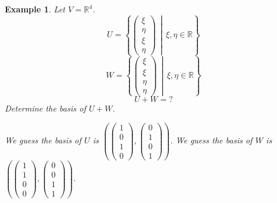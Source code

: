 \documentclass[a4paper,landscape,twocolumn]{article}
\newcommand\setdef[2]{\left\{#1\,\middle|\,#2\right\}}
\newtheorem{ex}{Example}
\begin{document}
\begin{ex}
  Let $V = \mathbb R^4$.
  \[ U = \setdef{\begin{pmatrix} \xi \\ \eta \\ \xi \\ \eta \end{pmatrix}}{\xi, \eta \in \mathbb R} \]
  \[ W = \setdef{\begin{pmatrix} \xi \\ \xi \\ \eta \\ \eta \end{pmatrix}}{\xi, \eta \in \mathbb R} \]
  \[ U + W = ? \]
  Determine the basis of $U + W$.

  We guess the basis of $U$ is $\left(\begin{pmatrix} 1 \\ 0 \\ 1 \\ 0 \end{pmatrix}, \begin{pmatrix} 0 \\ 1 \\ 0 \\ 1 \end{pmatrix}\right)$.
  We guess the basis of $W$ is $\left(\begin{pmatrix} 1 \\ 1 \\ 0 \\ 0 \end{pmatrix}, \begin{pmatrix} 0 \\ 0 \\ 1 \\ 1 \end{pmatrix}\right)$.


\end{ex}
\end{document}
